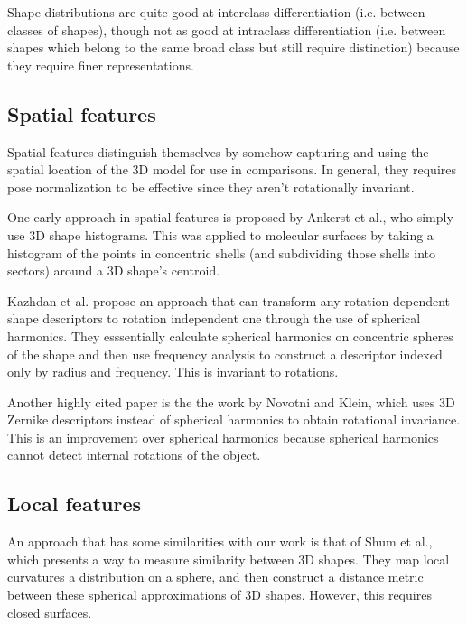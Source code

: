 \documentclass[../tech_report_1.tex]{subfiles}
\begin{document}
Shape distributions are quite good at interclass differentiation (i.e. between classes of shapes), though not as good at intraclass differentiation\cite{tangelder2008survey} (i.e. between shapes which belong to the same broad class but still require distinction) because they require finer representations.

\subsection{Spatial features}

Spatial features distinguish themselves by somehow capturing and using the spatial location of the 3D model for use in comparisons. In general, they requires pose normalization to be effective since they aren't rotationally invariant.

One early approach in spatial features is proposed by Ankerst et al.\cite{ankerst19993d}, who simply use 3D shape histograms. This was applied to molecular surfaces by taking a histogram of the points in concentric shells (and subdividing those shells into sectors) around a 3D shape's centroid.

Kazhdan et al.\cite{kazhdan2003rotation} propose an approach that can transform any rotation dependent shape descriptors to rotation independent one through the use of spherical harmonics. They esssentially calculate spherical harmonics on concentric spheres of the shape and then use frequency analysis to construct a descriptor indexed only by radius and frequency. This is invariant to rotations.

Another highly cited paper is the the work by Novotni and Klein\cite{novotni20033d}, which uses 3D Zernike descriptors instead of spherical harmonics to obtain rotational invariance. This is an improvement over spherical harmonics because spherical harmonics cannot detect internal rotations of the object.

\subsection{Local features}

An approach that has some similarities with our work is that of Shum et al., which presents a way to measure similarity between 3D shapes. They map local curvatures a distribution on a sphere, and then construct a distance metric between these spherical approximations of 3D shapes. However, this requires closed surfaces.
\end{document}
